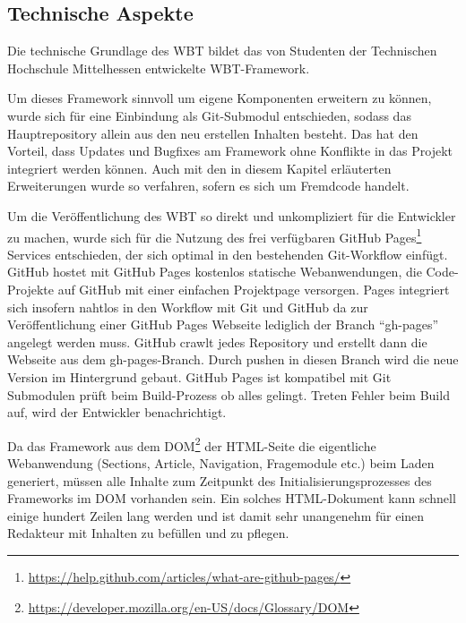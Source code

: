 \documentclass{article}
\begin{document}
\subsection{Technische Aspekte}
\label{ssec:tech}
Die technische Grundlage des WBT bildet das von Studenten der Technischen Hochschule Mittelhessen entwickelte WBT-Framework.

Um dieses Framework sinnvoll um eigene Komponenten erweitern zu k\"onnen, wurde sich f\"ur eine Einbindung als Git-Submodul\cite[S. 341 ff.]{chacon2014pro} entschieden, sodass das Hauptrepository allein aus den neu erstellen Inhalten besteht. Das hat den Vorteil, dass Updates und Bugfixes am Framework ohne Konflikte in das Projekt integriert werden k\"onnen. Auch mit den in diesem Kapitel erl\"auterten Erweiterungen wurde so verfahren, sofern es sich um Fremdcode handelt.

Um die Ver\"offentlichung des WBT so direkt und unkompliziert f\"ur die Entwickler zu machen, wurde sich f\"ur die Nutzung des frei verf\"ugbaren GitHub Pages\footnote{\url{https://help.github.com/articles/what-are-github-pages/}} Services entschieden, der sich optimal in den bestehenden Git-Workflow einf\"ugt. GitHub hostet mit GitHub Pages kostenlos statische Webanwendungen, die Code-Projekte auf GitHub mit einer einfachen Projektpage versorgen. Pages integriert sich insofern nahtlos in den Workflow mit Git und GitHub da zur Ver\"offentlichung einer GitHub Pages Webseite lediglich der Branch “gh-pages” angelegt werden muss. GitHub crawlt jedes Repository und erstellt dann die Webseite aus dem gh-pages-Branch. Durch pushen in diesen Branch wird die neue Version im Hintergrund gebaut. GitHub Pages ist kompatibel mit Git Submodulen pr\"uft beim Build-Prozess ob alles gelingt. Treten Fehler beim Build auf, wird der Entwickler benachrichtigt.

Da das Framework aus dem DOM\footnote{\url{https://developer.mozilla.org/en-US/docs/Glossary/DOM}} der HTML-Seite die eigentliche Webanwendung (Sections, Article, Navigation, Fragemodule etc.) beim Laden generiert, m\"ussen alle Inhalte zum Zeitpunkt des Initialisierungsprozesses des Frameworks im DOM vorhanden sein. Ein solches HTML-Dokument kann schnell einige hundert Zeilen lang werden und ist damit sehr unangenehm f\"ur einen Redakteur mit Inhalten zu bef\"ullen und zu pflegen. 
\end{document}
